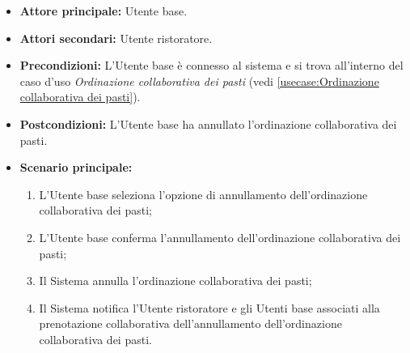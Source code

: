 \label{usecase:Annullamento dell'ordinazione}
\begin{itemize}
	\item \textbf{Attore principale:} Utente base.

	\item \textbf{Attori secondari:} Utente ristoratore.

	\item \textbf{Precondizioni:}
	      L'Utente base è connesso al sistema e si trova all'interno del caso
	      d'uso \textit{Ordinazione collaborativa dei pasti} (vedi
	      \autoref{usecase:Ordinazione collaborativa dei pasti}).

	\item \textbf{Postcondizioni:}
	      L'Utente base ha annullato l'ordinazione collaborativa dei pasti.

	\item \textbf{Scenario principale:}
	      \begin{enumerate}
		      \item L'Utente base seleziona l'opzione di annullamento
		            dell'ordinazione collaborativa dei pasti;

		      \item L'Utente base conferma l'annullamento dell'ordinazione
		            collaborativa dei pasti;

		      \item Il Sistema annulla l'ordinazione collaborativa dei pasti;

		      \item Il Sistema notifica l'Utente ristoratore e gli Utenti base
		            associati alla prenotazione collaborativa dell'annullamento
		            dell'ordinazione collaborativa dei pasti.
	      \end{enumerate}
\end{itemize}
